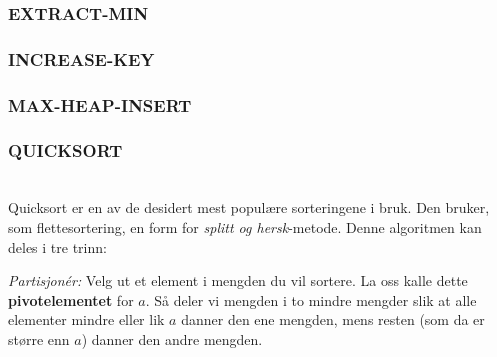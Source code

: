 \subsubsection{EXTRACT-MIN}

\subsubsection{INCREASE-KEY}

\subsubsection{MAX-HEAP-INSERT}

\subsubsection{QUICKSORT}\\
Quicksort er en av de desidert mest populære sorteringene i bruk. Den bruker, som flettesortering, en form for \textit{splitt og hersk}-metode. Denne algoritmen kan deles i tre trinn:\newline \newline

\textit{Partisjonér:} Velg ut et element i mengden du vil sortere. La oss kalle dette \textbf{pivotelementet} for $a$. Så deler vi mengden i to mindre mengder slik at alle elementer mindre eller lik $a$ danner den ene mengden, mens resten (som da er større enn $a$) danner den andre mengden.

